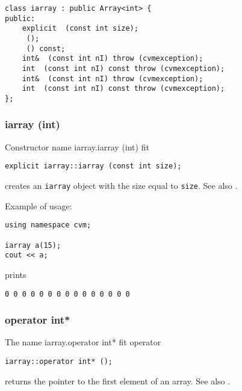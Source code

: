 \bigskip
\noindent
\verb"class iarray : public Array<int> {"\\
\verb"public:"\\
\verb"    explicit "\verb" (const int size);"\\
\verb"    "\verb" ();"\\
\verb"    "\verb" () const;"\\
\verb"    int& "\verb" (const int nI) throw (cvmexception);"\\
\verb"    int "\verb" (const int nI) const throw (cvmexception);"\\
\verb"    int& "\verb" (const int nI) throw (cvmexception);"\\
\verb"    int "\verb" (const int nI) const throw (cvmexception);"\\
\verb"};"
\newpage





\subsubsection{iarray (int)}
Constructor%
\pdfdest name {iarray.iarray (int)} fit
\begin{verbatim}
explicit iarray::iarray (const int size);
\end{verbatim}
creates an \verb"iarray" object with the size equal to \verb"size".
See also .

Example of usage:
\begin{verbatim}
using namespace cvm;

iarray a(15);
cout << a;
\end{verbatim}
prints
\begin{verbatim}
0 0 0 0 0 0 0 0 0 0 0 0 0 0 0
\end{verbatim}
\newpage


\subsubsection{operator int*}
The%
\pdfdest name {iarray.operator int*} fit
operator
\begin{verbatim}
iarray::operator int* ();
\end{verbatim}
returns the pointer to the first element of an array.
See also .

